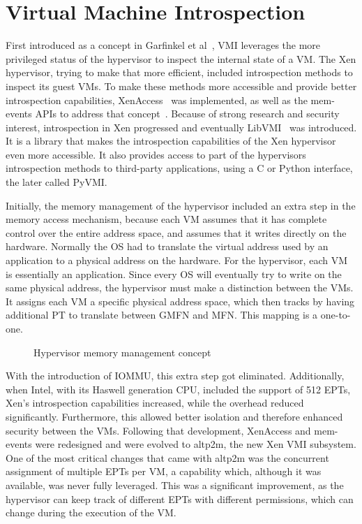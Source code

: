 \section{Virtual Machine Introspection}\label{sec:vmi}
First introduced as a concept in Garfinkel et al~\cite{garfinkel2003virtual}, \ac{VMI} leverages the more privileged status of the hypervisor to inspect the internal state of a \ac{VM}. The Xen hypervisor, trying to make that more efficient, included introspection methods to inspect its guest \ac{VM}s. To make these methods more accessible and provide better introspection capabilities, XenAccess~\cite{payne2007secure} was implemented, as well as the mem-events \ac{API}s to address that concept~\cite{lars_2016}. Because of strong research and security interest, introspection in Xen progressed and eventually LibVMI~\cite{payne2011libvmi} was introduced. It is a library that makes the introspection capabilities of the Xen hypervisor even more accessible. It also provides access to part of the hypervisors introspection methods to third-party applications, using a C or Python interface, the later called PyVMI.

\par Initially, the memory management of the hypervisor included an extra step in the memory access mechanism, because each \ac{VM} assumes that it has complete control over the entire address space, and assumes that it writes directly on the hardware. Normally the \ac{OS} had to translate the virtual address used by an application to a physical address on the hardware. For the hypervisor, each \ac{VM} is essentially an application. Since every \ac{OS} will eventually try to write on the same physical address, the hypervisor must make a distinction between the \ac{VM}s. It assigns each \ac{VM} a specific physical address space, which then tracks by having additional \ac{PT} to translate between \ac{GMFN} and \ac{MFN}. This mapping is a one-to-one.

\begin{figure}
	\centering
	
	\caption{Hypervisor memory management concept}
	\label{fig:hypmm}
\end{figure}

\par With the introduction of \ac{IOMMU}, this extra step got eliminated. Additionally, when Intel, with its Haswell generation \ac{CPU}, included the support of 512 \ac{EPT}s, Xen’s introspection capabilities increased, while the overhead reduced significantly. Furthermore, this allowed better isolation and therefore enhanced security between the \ac{VM}s. Following that development, XenAccess and mem-events were redesigned and were evolved to altp2m, the new Xen \ac{VMI} subsystem. One of the most critical changes that came with altp2m was the concurrent assignment of multiple \ac{EPT}s per \ac{VM}, a capability which, although it was available, was never fully leveraged. This was a significant improvement, as the hypervisor can keep track of different \ac{EPT}s with different permissions, which can change during the execution of the \ac{VM}.

